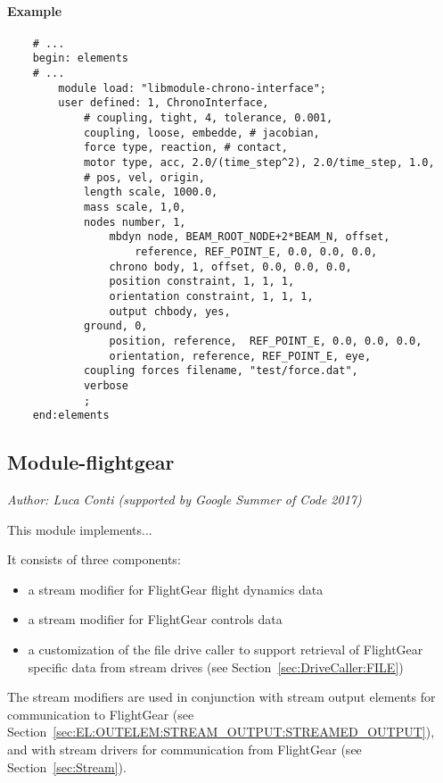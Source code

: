 \paragraph{Example}
\begin{Verbatim}
	# ...
	begin: elements
	# ...
		module load: "libmodule-chrono-interface";
		user defined: 1, ChronoInterface,
			# coupling, tight, 4, tolerance, 0.001,
			coupling, loose, embedde, # jacobian, 
			force type, reaction, # contact, 
			motor type, acc, 2.0/(time_step^2), 2.0/time_step, 1.0, 
			# pos, vel, origin,
			length scale, 1000.0,
			mass scale, 1,0,
			nodes number, 1,
				mbdyn node, BEAM_ROOT_NODE+2*BEAM_N, offset, 
					reference, REF_POINT_E, 0.0, 0.0, 0.0,
				chrono body, 1, offset, 0.0, 0.0, 0.0,
				position constraint, 1, 1, 1,
				orientation constraint, 1, 1, 1,
				output chbody, yes,
			ground, 0,
				position, reference,  REF_POINT_E, 0.0, 0.0, 0.0,
				orientation, reference, REF_POINT_E, eye,
			coupling forces filename, "test/force.dat",
			verbose
			;
	end:elements	
\end{Verbatim}

\subsection{Module-flightgear}
\emph{Author: Luca Conti (supported by Google Summer of Code 2017)}

\bigskip

\noindent
This module implements...

It consists of three components:
\begin{itemize}
\item a stream modifier for FlightGear flight dynamics data
\item a stream modifier for FlightGear controls data
\item a customization of the file drive caller to support retrieval of FlightGear specific data
from stream drives (see Section~\ref{sec:DriveCaller:FILE})
\end{itemize}
The stream modifiers are used in conjunction with stream output elements for communication to FlightGear
(see Section~\ref{sec:EL:OUTELEM:STREAM_OUTPUT:STREAMED_OUTPUT}),
and with stream drivers for communication from FlightGear
(see Section~\ref{sec:Stream}).

